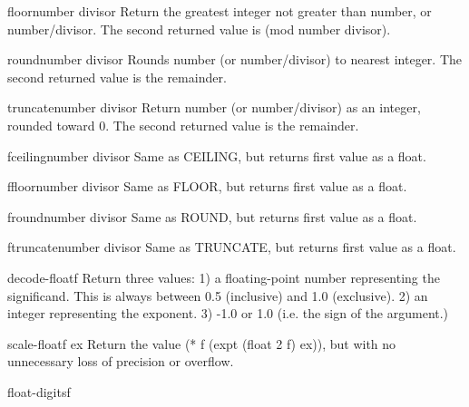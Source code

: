 \begin{function}{floor}{number \op divisor}{}{}
  Return the greatest integer not greater than number, or number/divisor.
  The second returned value is (mod number divisor).
\end{function}

\begin{function}{round}{number \op divisor}{}{}
  Rounds number (or number/divisor) to nearest integer.
  The second returned value is the remainder.
\end{function}

\begin{function}{truncate}{number \op divisor}{}{}
  Return number (or number/divisor) as an integer, rounded toward 0.
  The second returned value is the remainder.
\end{function}

\begin{function}{fceiling}{number \op divisor}{}{}
  Same as CEILING, but returns first value as a float.
\end{function}

\begin{function}{ffloor}{number \op divisor}{}{}
  Same as FLOOR, but returns first value as a float.
\end{function}

\begin{function}{fround}{number \op divisor}{}{}
  Same as ROUND, but returns first value as a float.
\end{function}

\begin{function}{ftruncate}{number \op divisor}{}{}
  Same as TRUNCATE, but returns first value as a float.
\end{function}

\begin{function}{decode-float}{f}{}{}
  Return three values:
   1) a floating-point number representing the significand. This is always
      between 0.5 (inclusive) and 1.0 (exclusive).
   2) an integer representing the exponent.
   3) -1.0 or 1.0 (i.e. the sign of the argument.)
\end{function}

\begin{function}{scale-float}{f ex}{}{}
  Return the value (* f (expt (float 2 f) ex)), but with no unnecessary loss
  of precision or overflow.
\end{function}

\begin{function}{float-digits}{f}{}{}
  
\end{function}

